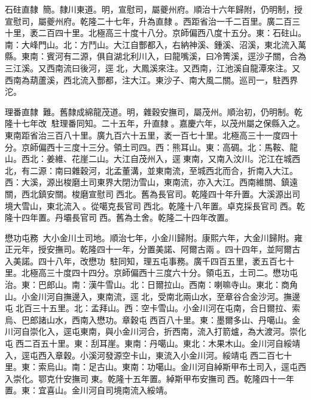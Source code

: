 \begin{pinyinscope}
石砫直隸：簡。隸川東道。明，宣慰司，屬夔州府。順治十六年歸附，仍明制，授宣慰司，屬夔州府。乾隆二十七年，升為直隸。西距省治一千二百里。廣二百三十里，袤二百四十里。北極高三十度十八分。京師偏西八度十五分。東：石砫山。南：大峰門山。北：方鬥山。大江自酆都入，右納神溪、鍾溪、沼溪，東北流入萬縣。東南：賓河有二源，俱自湖北利川入，曰龍嘴溪，曰冷箐溪，逕沙子關，合為三江溪。又西南流曰後河，逕北，大鳳溪來注。又西南，江池溪自龍潭來注。又西南為葫蘆溪，西北流入酆都，注大江。東沙子、南大風二關。巡司一，駐西界沱。

理番直隸：難。舊隸成綿龍茂道。明，雜穀安撫司，屬茂州。順治初，仍明制。乾隆十七年改，駐理番同知。二十五年，升直隸。嘉慶六年，以茂州屬之保縣入之。東南距省治三百八十里。廣九百六十五里，袤一百七十里。北極高三十一度四十分。京師偏西十三度十三分。領土司四。西：熊耳山。東：高碉。北：馬鞍、龍山。西北：姜維、花崖二山。大江自茂州入，逕東南，又南入汶川。沱江在城西北，有二源：南曰雜穀河，北孟董溝，並東南流，至城西北而合，折南入大江。西：大溪，源出梭磨土司東界大閉氻雪山，東南流，亦入大江。西南維關、鎮遠關，西北鎮安關。梭磨宣慰司西北。舊為長官司。乾隆四十年升置。大溪源出司境大雪山，東北流入。從噶克長官司西北。乾隆十八年置。卓克採長官司西。乾隆十四年置。丹壩長官司西。舊為土舍。乾隆二十四年改置。

懋功屯務：大小金川土司地。順治七年，小金川歸附。康熙六年，大金川歸附。雍正元年，授安撫司。乾隆四十一年，分置美諾、阿爾古兩。四十四年，並阿爾古入美諾。四十八年，改懋功，駐同知，理五屯事務。廣千四百五里，袤五百七十里。北極高三十度四十四分。京師偏西十三度六十分。領屯五，土司二。懋功屯治。東：巴郎山。南：漢牛雪山。北：日爾拉山。西南：喇嘛寺山。東北：商角山。小金川河自撫邊入，東南流，逕北，受南北兩山水，至章谷合金沙河。撫邊屯北百三十五里。北：孟拜山。西：空卡雪山。小金川河在屯南，合日爾拉、索烏、巴郎諸山水，西南入懋功。章穀屯西百八十里。東：墨爾多山、丹噶山。金川河自崇化入，逕屯東南，與小金川河合，折西南，流入打箭爐，為大渡河。崇化屯西二百五十里。東：刮耳崖。東南：丹噶山。東北：木果木山。金川河自綏靖入，逕屯西入章穀。小溪河發源空卡山，東流入小金川河。綏靖屯西二百七十里。東：索烏山。南：足古山。東南：功噶山。金川河自綽斯甲布土司入，逕屯西入崇化。鄂克什安撫司東。乾隆十五年置。綽斯甲布安撫司西。乾隆四十一年置。東：宜喜山。金川河自司境南流入綏靖。


\end{pinyinscope}